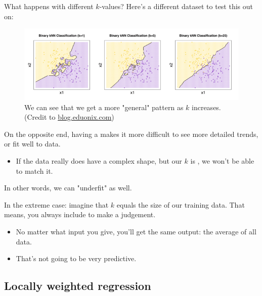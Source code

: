         What happens with different $k$-values? Here's a different dataset to test this out on:

        \begin{figure}[H]
            \centering
            \includegraphics[width=140mm,scale=0.5]{images/nonparametric_images/knn_diff_k_values.png}
    
            \caption*{We can see that we get a more "general" pattern as $k$ increases. (Credit to \href{https://blog.eduonix.com/artificial-intelligence/k-nearest-neighbors-algorithm/}{blog.eduonix.com})}
        \end{figure}

        \begin{concept}
            On the opposite end, having a  makes it more difficult to see more detailed trends, or fit well to  data.

            \begin{itemize}
                \item If the data really does have a complex shape, but our $k$ is , we won't be able to match it.
            \end{itemize}

            In other words, we can "underfit" as well.
        \end{concept}

        \miniex In the extreme case: imagine that $k$ equals the size of our training data. That means, you always include  to make a judgement.

        \begin{itemize}
            \item No matter what input you give, you'll  get the same output: the average of all data.
            \item That's not going to be very predictive.
        \end{itemize}

    \phantom{}

    \subsection{Locally weighted regression}

